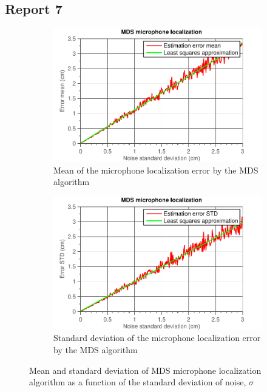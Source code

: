\documentclass[11pt,titlepage]{report}
\begin{document}
\subsection{Report 7}
\begin{figure}[H]
	\begin{subfigure}{.49\textwidth}
		\includegraphics[width=\linewidth]{../../deliverable-7-resources/figures/ass-2/report-7-8/ass-2-report-7-mean.pdf}
		\caption{\centering Mean of the microphone localization error by the MDS algorithm}
	\end{subfigure}
	\begin{subfigure}{.49\textwidth}
		\includegraphics[width=\linewidth]{../../deliverable-7-resources/figures/ass-2/report-7-8/ass-2-report-7-std.pdf}
		\caption{\centering Standard deviation of the microphone localization error by the MDS algorithm}
	\end{subfigure}
	\caption{Mean and standard deviation of MDS microphone localization algorithm as a function of the standard deviation of noise, $\sigma$}
	\label{fig:ass-2-rep-7}
\end{figure}
\end{document}
